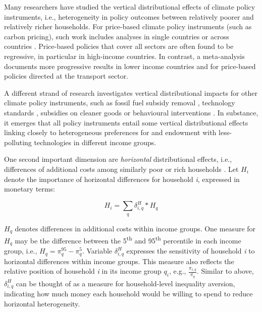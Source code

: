 \documentclass[12pt, a4paper]{article}
\begin{document}
Many researchers have studied the vertical distributional effects of climate policy instruments, i.e., heterogeneity in policy outcomes between relatively poorer and relatively richer households. For price-based climate policy instruments (such as carbon pricing), such work includes analyses in single countries \autocite{Goulder.2019,Grainger.2010,Rausch.2011,Garaffa.2021,Sterner.2012,Wu.2022} or across countries \autocite{Budolfson.2021,Feindt.2021,Dorband.2019,Steckel.2021b,VogtSchilb.2019,Missbach.2024}. Price-based policies that cover all sectors are often found to be regressive, in particular in high-income countries. In contrast, a meta-analysis \autocite{Ohlendorf.2021} documents more progressive results in lower income countries and for price-based policies directed at the transport sector.

A different strand of research investigates vertical distributional impacts for other climate policy instruments, such as fossil fuel subsidy removal \autocite{Schaffitzel.2019,Giuliano.2020,DelArzeGranado.2012}, technology standards \autocite{Levinson.2019,Zhao.2022,Bruegge.2019}, subsidies on cleaner goods \autocite{Borenstein.2016,Vaishnav.2017,Winter.2019} or behavioural interventions \autocite{DellaValle.2020,Liebe.2021}. In substance, it emerges that all policy instruments entail some vertical distributional effects linking closely to heterogeneous preferences for and endowment with less-polluting technologies in different income groups. 

One second important dimension are \textit{horizontal} distributional effects, i.e., differences of additional costs among similarly poor or rich households \autocite{Rausch.2011,Fischer.2019}. Let $H_{i}$ denote the importance of horizontal differences for household \textit{i}, expressed in monetary terms:

\begin{equation}
    H_{i} = \sum_{q} \delta_{i,q}^{H} * H_{q}
\end{equation}

$H_{q}$ denotes differences in additional costs within income groups. One measure for $H_{q}$ may be the difference between the 5\textsuperscript{th} and 95\textsuperscript{th} percentile in each income group, i.e., $H_{q}=\pi_{q}^{95}-\pi_{q}^{5}$. Variable $\delta_{i,q}^{H}$ expresses the sensitivity of household \textit{i} to horizontal differences within income groups. This measure also reflects the relative position of household \textit{i} in its income group $q_{i}$, e.g., $\frac{\pi_{i,q}}{\overline{\pi_{q}}}$. Similar to above, $\delta_{i,q}^{H}$ can be thought of as a measure for household-level inequality aversion, indicating how much money each household would be willing to spend to reduce horizontal heterogeneity.
\end{document}
